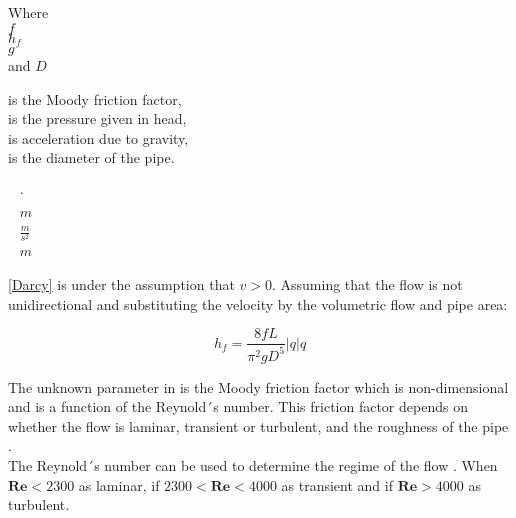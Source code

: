  \begin{minipage}[t]{0.20\textwidth}
Where\\
\hspace*{8mm} $f$ \\
\hspace*{8mm} $h_f$ \\
\hspace*{8mm} $g$ \\
and \hspace*{0.7mm} $D$ 
\end{minipage}
\begin{minipage}[t]{0.68\textwidth}
\vspace*{2mm}
is the Moody friction factor,\\ 
is the pressure given in head,\\ 
is acceleration due to gravity,\\
is the diameter of the pipe.
\end{minipage}
\begin{minipage}[t]{0.10\textwidth}
\vspace*{2mm}
\textcolor{White}{te}$\unit{\cdot}$\\
\textcolor{White}{te}$\unit{m}$\\
\textcolor{White}{te}$\unit{\frac{m}{s^2}}$\\
\textcolor{White}{te}$\unit{m}$
\end{minipage}

\eqref{Darcy} is under the assumption that $v>0$. %
 Assuming that the flow is not unidirectional and substituting the velocity by the volumetric flow and pipe area:

\begin{equation}
  h_f = \frac{8fL}{\pi^{2}gD^5} |q| q
  \label{DarcyWeisbach}
\end{equation} 
 
 The unknown parameter in  is the Moody friction factor 
 which is non-dimensional and is a function of the Reynold´s number. This friction factor depends on whether the flow is laminar, transient or turbulent, and the roughness of the pipe \cite{Intro_Fluid}. \\
 
 
The Reynold´s number can be used to determine the regime of the flow \cite{Intro_Fluid}. When $\pmb{Re}<2300$ as laminar, if $2300<\pmb{Re}<4000$ as transient and if
$\pmb{Re}>4000$ as turbulent. 

